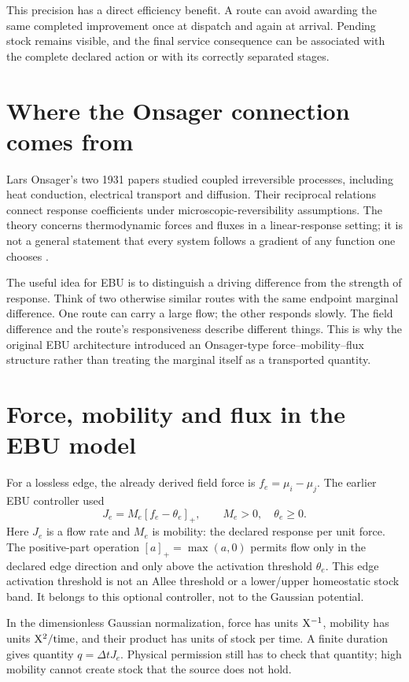 This precision has a direct efficiency benefit. A route can avoid awarding the same completed improvement once at dispatch and again at arrival. Pending stock remains visible, and the final service consequence can be associated with the complete declared action or with its correctly separated stages.

\section{Where the Onsager connection comes from}
Lars Onsager's two 1931 papers studied coupled irreversible processes, including
heat conduction, electrical transport and diffusion. Their reciprocal relations
connect response coefficients under microscopic-reversibility assumptions.
The theory concerns thermodynamic forces and fluxes in a linear-response
setting; it is not a general statement that every system follows a gradient
of any function one chooses \cite{onsager-one,onsager-two}.

The useful idea for EBU is to distinguish a driving difference from the
strength of response. Think of two otherwise similar routes with the same
endpoint marginal difference. One route can carry a large flow; the other
responds slowly. The field difference and the route's responsiveness describe
different things. This is why the original EBU architecture introduced an
Onsager-type force--mobility--flux structure rather than treating the marginal
itself as a transported quantity.

\section{Force, mobility and flux in the EBU model}
For a lossless edge, the already derived field force is
\(f_e=\mu_i-\mu_j\). The earlier EBU controller used
\begin{equation}\label{eq:intro-onsager}
 J_e=M_e[f_e-\theta_e]_+,\qquad M_e>0,\quad\theta_e\geq0.
\end{equation}
Here \(J_e\) is a flow rate and \(M_e\) is mobility: the declared response
per unit force. The positive-part operation \([a]_+=\max(a,0)\) permits
flow only in the declared edge direction and only above the activation
threshold \(\theta_e\). This edge activation threshold is not an Allee
threshold or a lower/upper homeostatic stock band. It belongs to this optional
controller, not to the Gaussian potential.

In the dimensionless Gaussian normalization, force has units \(\mathrm{X}^{-1}\),
mobility has units \(\mathrm{X}^2/\mathrm{time}\), and their product has units of
stock per time. A finite duration gives quantity \(q=\Delta t J_e\).
Physical permission still has to check that quantity; high mobility cannot
create stock that the source does not hold.

